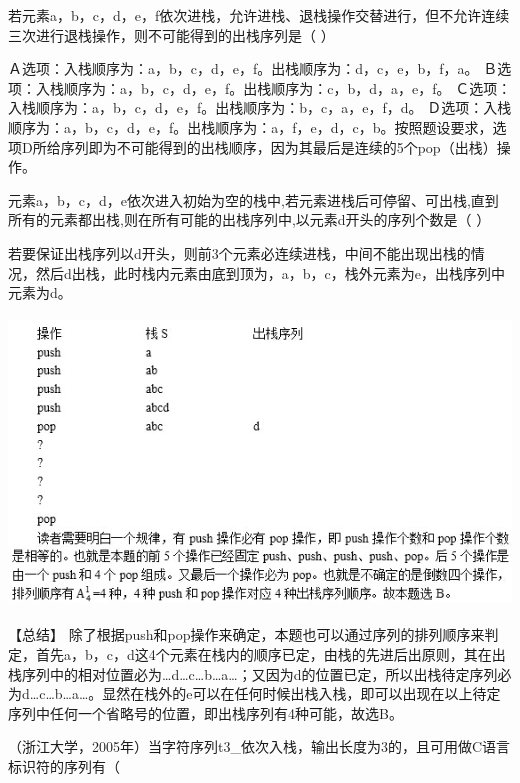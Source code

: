 \question 若元素a，b，c，d，e，f依次进栈，允许进栈、退栈操作交替进行，但不允许连续三次进行退栈操作，则不可能得到的出栈序列是（
）
\par{}
\begin{solution}Ａ选项：入栈顺序为：a，b，c，d，e，f。出栈顺序为：d，c，e，b，f，a。
Ｂ选项：入栈顺序为：a，b，c，d，e，f。出栈顺序为：c，b，d，a，e，f。
Ｃ选项：入栈顺序为：a，b，c，d，e，f。出栈顺序为：b，c，a，e，f，d。
Ｄ选项：入栈顺序为：a，b，c，d，e，f。出栈顺序为：a，f，e，d，c，b。按照题设要求，选项D所给序列即为不可能得到的出栈顺序，因为其最后是连续的5个pop（出栈）操作。
\end{solution}
\question 元素a，b，c，d，e依次进入初始为空的栈中,若元素进栈后可停留、可出栈,直到所有的元素都出栈,则在所有可能的出栈序列中,以元素d开头的序列个数是（
）
\par{}
\begin{solution}若要保证出栈序列以d开头，则前3个元素必连续进栈，中间不能出现出栈的情况，然后d出栈，此时栈内元素由底到顶为，a，b，c，栈外元素为e，出栈序列中元素为d。
\includegraphics[width=5.90625in,height=3.31250in]{computerassets/e6ce6cda40e4109f129b7eaf9d62c8e2.jpeg}
【总结】
除了根据push和pop操作来确定，本题也可以通过序列的排列顺序来判定，首先a，b，c，d这4个元素在栈内的顺序已定，由栈的先进后出原则，其在出栈序列中的相对位置必为\ldots{}d\ldots{}c\ldots{}b\ldots{}a\ldots{}；又因为d的位置已定，所以出栈待定序列必为d\ldots{}c\ldots{}b\ldots{}a\ldots{}。显然在栈外的e可以在任何时候出栈入栈，即可以出现在以上待定序列中任何一个省略号的位置，即出栈序列有4种可能，故选B。
\end{solution}
\question （浙江大学，2005年）当字符序列t3\_依次入栈，输出长度为3的，且可用做C语言标识符的序列有（
